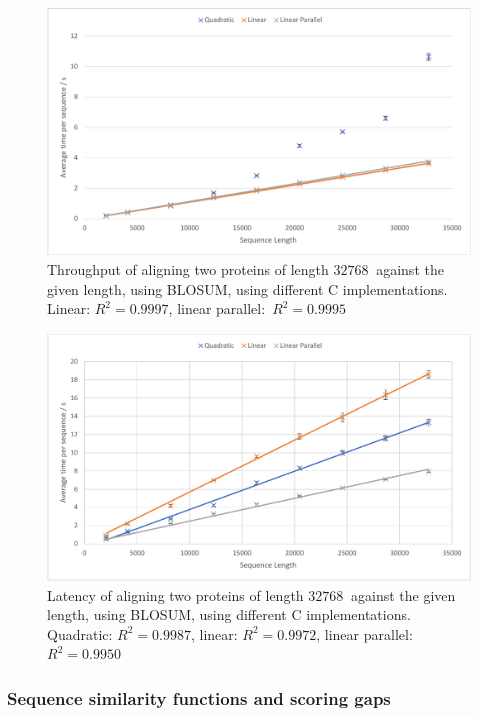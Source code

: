 \begin{figure}
    \centering
    \includegraphics[width=\textwidth]{figs/eval/c_spaces_il.pdf}
    \caption{Throughput of aligning two proteins of length $\SI{32768}{}$ against the given length, using BLOSUM, using different C implementations. Linear: $R^2=0.9997$, linear parallel:~${R^2=0.9995}$}
    \label{fig:C_Space_IL}
\end{figure}

\begin{figure}
    \centering
    \includegraphics[width=\textwidth]{figs/eval/c_spaces_ser.pdf}
    \caption{Latency of aligning two proteins of length $\SI{32768}{}$ against the given length, using BLOSUM, using different C implementations. Quadratic: $R^2=0.9987$, linear: $R^2=0.9972$, linear parallel:~${R^2=0.9950}$}
    \label{fig:C_Space_Ser}
\end{figure}

\subsubsection{Sequence similarity functions and scoring gaps}
\label{sec:C_scoring_eval}


